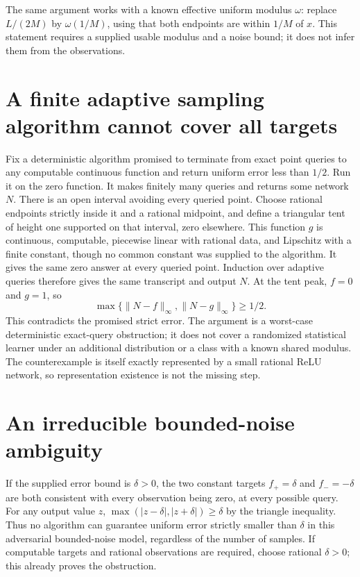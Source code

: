 \documentclass[11pt]{article}
\begin{document}
The same argument works with a known effective uniform modulus
$\omega$: replace $L/(2M)$ by $\omega(1/M)$, using that
both endpoints are within $1/M$ of $x$. This statement
requires a supplied usable modulus and a noise bound; it does
not infer them from the observations.

\section{A finite adaptive sampling algorithm cannot cover all targets}
Fix a deterministic algorithm promised to terminate from exact
point queries to any computable continuous function and return
uniform error less than $1/2$. Run it on the zero function.
It makes finitely many queries and returns some network $N$.
There is an open interval avoiding every queried point. Choose
rational endpoints strictly inside it and a rational midpoint,
and define a triangular tent of height one supported on that
interval, zero elsewhere. This function $g$ is continuous,
computable, piecewise linear with rational data, and Lipschitz
with a finite constant, though no common constant was supplied
to the algorithm. It gives the same zero answer at every
queried point. Induction over adaptive queries therefore gives
the same transcript and output $N$.
At the tent peak, $f=0$ and $g=1$, so
\[
 \max\{\|N-f\|_\infty,\|N-g\|_\infty\}\ge1/2.
\]
This contradicts the promised strict error. The argument is a
worst-case deterministic exact-query obstruction; it does not
cover a randomized statistical learner under an additional
distribution or a class with a known shared modulus. The
counterexample is itself exactly represented by a small rational
ReLU network, so representation existence is not the missing step.

\section{An irreducible bounded-noise ambiguity}
If the supplied error bound is $\delta>0$, the two constant
targets $f_+=\delta$ and $f_-=-\delta$ are both consistent
with every observation being zero, at every possible query.
For any output value $z$,
$\max(|z-\delta|,|z+\delta|)\ge\delta$ by the triangle
inequality. Thus no algorithm can guarantee uniform error
strictly smaller than $\delta$ in this adversarial bounded-noise
model, regardless of the number of samples. If computable
targets and rational observations are required, choose rational
$\delta>0$; this already proves the obstruction.
\end{document}
